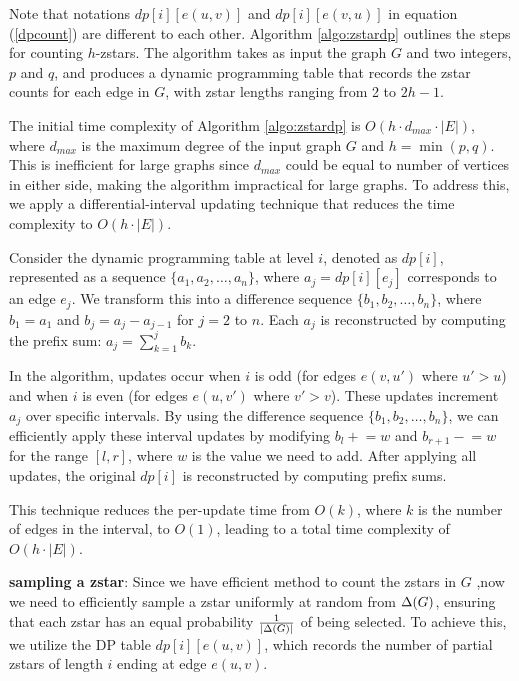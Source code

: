 Note that notations  $dp[i][e(u, v)] $ and $dp[i][e(v, u)] $ in equation (\ref{dpcount}) are different to each other. Algorithm \ref{algo:zstardp} outlines the steps for counting $h$-zstars. The algorithm takes as input the graph $G$ and two integers, $p$ and $q$, and produces a dynamic programming table that records the zstar counts for each edge in $G$, with zstar lengths ranging from 2 to $2h-1$.


The initial time complexity of Algorithm \ref{algo:zstardp} is $ O(h\cdot d_{max} \cdot |E|) $, where $ d_{max} $ is the maximum degree of the input graph $G$ and $ h = \min(p, q) $. This is inefficient for large graphs since $ d_{max} $ could be equal to number of vertices in either side, making the algorithm impractical for large graphs. To address this, we apply a differential-interval updating technique that reduces the time complexity to $ O(h \cdot |E|) $.

Consider the dynamic programming table at level $ i $, denoted as $ dp[i] $, represented as a sequence $ \{a_1, a_2, \dots, a_n\} $, where $ a_j = dp[i][e_j] $ corresponds to an edge $ e_j $. We transform this into a difference sequence $ \{b_1, b_2, \dots, b_n\} $, where $ b_1 = a_1 $ and $ b_j = a_j - a_{j-1} $ for $ j = 2 $ to $ n $. Each $ a_j $ is reconstructed by computing the prefix sum: $ a_j = \sum_{k=1}^{j} b_k $.

In the algorithm, updates occur when $ i $ is odd (for edges $ e(v, u') $ where $ u' > u $) and when $ i $ is even (for edges $ e(u, v') $ where $ v' > v $). These updates increment $ a_j $ over specific intervals. By using the difference sequence $ \{b_1, b_2, \dots, b_n\} $, we can efficiently apply these interval updates by modifying $ b_l \mathrel{+}= w $ and $ b_{r+1} \mathrel{-}= w $ for the range $[l, r]$, where $w$ is the value we need to add. After applying all updates, the original $ dp[i] $ is reconstructed by computing prefix sums.

This technique reduces the per-update time from $ O(k) $, where $ k $ is the number of edges in the interval, to $ O(1) $, leading to a total time complexity of $ O(h \cdot |E|) $.

\textbf{sampling a zstar}: Since we have efficient method to count the zstars in $G$ ,now we need to efficiently sample a zstar uniformly at random from $\Delta (G)$, ensuring that each zstar has an equal probability $\frac{1}{|\Delta (G)|}$ of being selected. To achieve this, we utilize the DP table $dp[i][e(u,v)]$, which records the number of partial zstars of length $i$ ending at edge $e(u,v)$.


